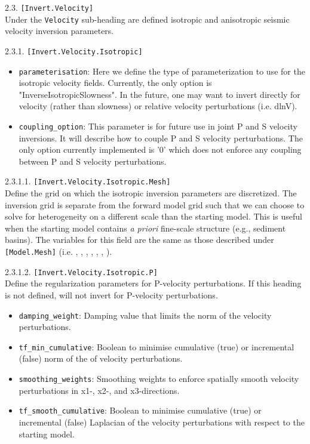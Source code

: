 2.3. \texttt{[Invert.Velocity]}\\
Under the \texttt{Velocity} sub-heading are defined isotropic and anisotropic seismic velocity inversion parameters.

2.3.1. \texttt{[Invert.Velocity.Isotropic]}
\begin{itemize}
\item \texttt{parameterisation}: Here we define the type of parameterization to use for the isotropic velocity fields. Currently, the only option is "InverseIsotropicSlowness". In the future, one may want to invert directly for velocity (rather than slowness) or relative velocity perturbations (i.e. dlnV).
\item \texttt{coupling\_option}: This parameter is for future use in joint P and S velocity inversions. It will describe how to couple P and S velocity perturbations. The only option currently implemented is '0' which does not enforce any coupling between P and S velocity perturbations.
\end{itemize}

2.3.1.1. \texttt{[Invert.Velocity.Isotropic.Mesh]}\\
Define the grid on which the isotropic inversion parameters are discretized. The inversion grid is separate from the forward model grid such that we can choose to solve for heterogeneity on a different scale than the starting model. This is useful when the starting model contains \textit{a priori} fine-scale structure (e.g., sediment basins). The variables for this field are the same as those described under \texttt{[Model.Mesh]} (i.e. , , , , , , ).

2.3.1.2. \texttt{[Invert.Velocity.Isotropic.P]}\\
Define the regularization parameters for P-velocity perturbations. If this heading is not defined, will not invert for P-velocity perturbations.
\begin{itemize}
    \item \texttt{damping\_weight}: Damping value that limits the norm of the velocity perturbations.
    \item \texttt{tf\_min\_cumulative}: Boolean to minimise cumulative (true) or incremental (false) norm of the of velocity perturbations.
    \item \texttt{smoothing\_weights}: Smoothing weights to enforce spatially smooth velocity perturbations in x1-, x2-, and x3-directions.
    \item \texttt{tf\_smooth\_cumulative}: Boolean to minimise cumulative (true) or incremental (false) Laplacian of the velocity perturbations with respect to the starting model.
\end{itemize}

